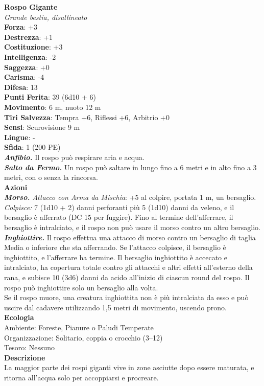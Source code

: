 \begin{multicols}{2}
\medskip\textbf{Rospo Gigante}\\
\emph{Grande bestia, disallineato}\\
\textbf{Forza}: +3\\
\textbf{Destrezza}: +1\\
\textbf{Costituzione}: +3\\
\textbf{Intelligenza}: -2\\
\textbf{Saggezza}: +0\\
\textbf{Carisma}: -4\\
\textbf{Difesa}: 13\\
\textbf{Punti Ferita}: 39 (6d10 + 6)\\
\textbf{Movimento}: 6 m, nuoto 12 m\\
\textbf{Tiri Salvezza}: Tempra +6, Riflessi +6, Arbitrio +0\\
\textbf{Sensi}: Scurovisione 9 m\\
\textbf{Lingue}: -\\
\textbf{Sfida}: 1 (200 PE)\smallskip\\
\emph{\textbf{Anfibio.}} Il rospo può respirare aria e acqua.\\
\emph{\textbf{Salto da Fermo.}} Un rospo può saltare in lungo fino a 6 metri e in alto fino a 3 metri, con o senza la rincorsa.\\
\smallskip\textbf{Azioni}\\
\emph{\textbf{Morso.} Attacco con Arma da Mischia}: +5 al colpire, portata 1 m, un bersaglio.\\

\emph{Colpisce:} 7 (1d10 + 2) danni perforanti più 5 (1d10) danni da veleno, e il bersaglio è afferrato (DC  15 per fuggire). Fino al termine dell'afferrare, il bersaglio è intralciato, e il rospo non può usare il morso contro un altro bersaglio.  \\
\emph{\textbf{Inghiottire.}} Il rospo effettua una attacco di morso contro un bersaglio di taglia Media o inferiore che sta afferrando. Se l'attacco colpisce, il bersaglio è inghiottito, e l'afferrare ha termine. Il bersaglio inghiottito è accecato e intralciato, ha copertura totale contro gli attacchi e altri effetti all'esterno della rana, e subisce 10 (3d6) danni da acido all'inizio di ciascun round del rospo. Il rospo può inghiottire solo un bersaglio alla volta.\\
Se il rospo muore, una creatura inghiottita non è più intralciata da esso e può uscire dal cadavere utilizzando 1,5 metri di movimento, uscendo prono.\\
\textbf{Ecologia}\\
Ambiente: Foreste, Pianure o Paludi Temperate\\
Organizzazione: Solitario, coppia o crocchio (3–12)\\
Tesoro: Nessuno\\
\textbf{Descrizione}\\
La maggior parte dei rospi giganti vive in zone asciutte dopo essere maturata, e ritorna all'acqua solo per accoppiarsi e procreare.\\


\end{multicols}
